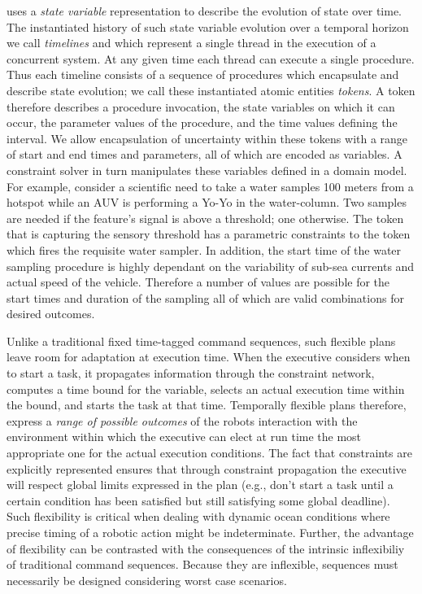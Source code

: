 \eu uses a \emph{state variable} representation to describe the
evolution of state over time. The instantiated history of such state
variable evolution over a temporal horizon we call \emph{timelines}
and which represent a single thread in the execution of a concurrent
system. At any given time each thread can execute a single procedure.
Thus each timeline consists of a sequence of procedures which
encapsulate and describe state evolution; we call these instantiated
atomic entities \emph{tokens}.  A token therefore describes a
procedure invocation, the state variables on which it can occur, the
parameter values of the procedure, and the time values defining the
interval. We allow encapsulation of uncertainty within these tokens
with a range of start and end times and parameters, all of which are
encoded as variables. A constraint solver in turn manipulates these
variables defined in a \eu domain model. For example, consider
a scientific need to take a water samples 100 meters from a hotspot
while an AUV is performing a Yo-Yo in the water-column. Two samples
are needed if the feature's signal is above a threshold; one
otherwise. The token that is capturing the sensory threshold has a
parametric constraints to the token which fires the requisite water
sampler. In addition, the start time of the water sampling procedure
is highly dependant on the variability of sub-sea currents and actual
speed of the vehicle. Therefore a number of values are possible for
the start times and duration of the sampling all of which are valid
combinations for desired outcomes.

Unlike a traditional fixed time-tagged command sequences, such
flexible plans leave room for adaptation at execution time. When the
executive considers when to start a task, it propagates information
through the constraint network, computes a time bound for the
variable, selects an actual execution time within the bound, and
starts the task at that time. Temporally flexible plans therefore,
express a \textit{range of possible outcomes} of the robots
interaction with the environment within which the executive can elect
at run time the most appropriate one for the actual execution
conditions. The fact that constraints are explicitly represented
ensures that through constraint propagation the executive will respect
global limits expressed in the plan (e.g., don't start a task until a
certain condition has been satisfied but still satisfying some global
deadline). Such flexibility is critical when dealing with dynamic
ocean conditions where precise timing of a robotic action might be
indeterminate. Further, the advantage of flexibility can be contrasted
with the consequences of the intrinsic inflexibiliy of traditional
command sequences. Because they are inflexible, sequences must
necessarily be designed considering worst case scenarios.


